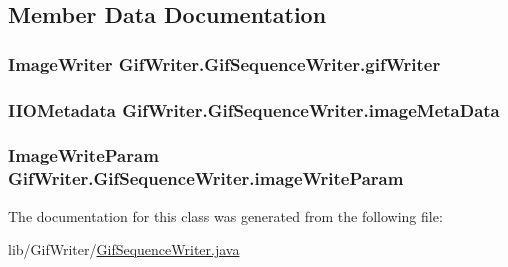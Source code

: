 \subsection{Member Data Documentation}
\hypertarget{classGifWriter_1_1GifSequenceWriter_ac5b9a3a2b830ae09ba1df04ca5228284}{
\subsubsection[{gif\-Writer}]{\setlength{\rightskip}{0pt plus 5cm}Image\-Writer Gif\-Writer.\-Gif\-Sequence\-Writer.\-gif\-Writer\hspace{0.3cm}{\ttfamily [protected]}}}\label{classGifWriter_1_1GifSequenceWriter_ac5b9a3a2b830ae09ba1df04ca5228284}
\hypertarget{classGifWriter_1_1GifSequenceWriter_a555373d5fe3055f70c0938af574abf53}{
\subsubsection[{image\-Meta\-Data}]{\setlength{\rightskip}{0pt plus 5cm}I\-I\-O\-Metadata Gif\-Writer.\-Gif\-Sequence\-Writer.\-image\-Meta\-Data\hspace{0.3cm}{\ttfamily [protected]}}}\label{classGifWriter_1_1GifSequenceWriter_a555373d5fe3055f70c0938af574abf53}
\hypertarget{classGifWriter_1_1GifSequenceWriter_a386eed4fb122722b958f9f1fb7e96e81}{
\subsubsection[{image\-Write\-Param}]{\setlength{\rightskip}{0pt plus 5cm}Image\-Write\-Param Gif\-Writer.\-Gif\-Sequence\-Writer.\-image\-Write\-Param\hspace{0.3cm}{\ttfamily [protected]}}}\label{classGifWriter_1_1GifSequenceWriter_a386eed4fb122722b958f9f1fb7e96e81}


The documentation for this class was generated from the following file\-:\begin{DoxyCompactItemize}
\item 
lib/\-Gif\-Writer/\hyperlink{GifSequenceWriter_8java}{Gif\-Sequence\-Writer.\-java}\end{DoxyCompactItemize}
